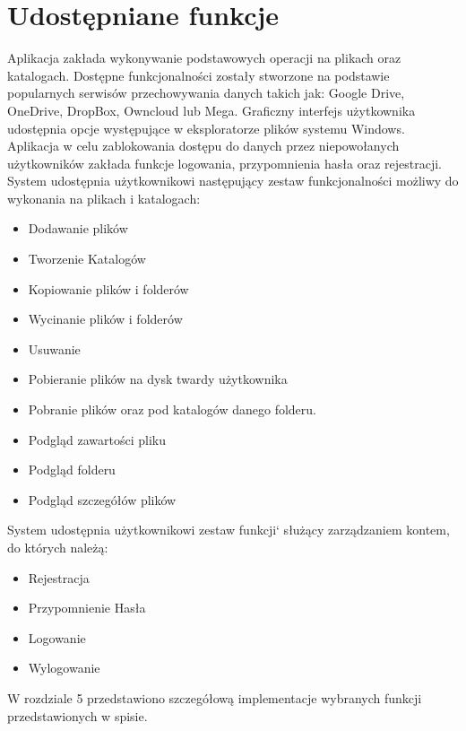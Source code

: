 \section{Udostępniane funkcje}
Aplikacja zakłada wykonywanie podstawowych operacji na plikach oraz katalogach. Dostępne funkcjonalności zostały stworzone na podstawie popularnych serwisów przechowywania danych takich jak: Google Drive, OneDrive, DropBox, Owncloud lub Mega. Graficzny interfejs użytkownika udostępnia opcje występujące w eksploratorze plików systemu Windows. 
Aplikacja w celu zablokowania dostępu do danych przez niepowołanych użytkowników zakłada funkcje logowania, przypomnienia hasła oraz rejestracji.  
\newpage
System udostępnia użytkownikowi następujący zestaw funkcjonalności możliwy do wykonania na plikach i katalogach:
\begin{itemize}[align=left]
	\item Dodawanie plików 
	\item Tworzenie Katalogów
	\item Kopiowanie plików i folderów
	\item Wycinanie plików i folderów
	\item Usuwanie
	\item Pobieranie plików na dysk twardy użytkownika
	\item Pobranie plików oraz pod katalogów danego folderu.
	\item Podgląd zawartości pliku 
	\item Podgląd folderu
	\item Podgląd szczegółów plików
\end{itemize}

System udostępnia użytkownikowi zestaw funkcji`  służący zarządzaniem kontem, do których należą:
\begin{itemize}[align=left]
	\item Rejestracja
	\item Przypomnienie Hasła
	\item Logowanie
	\item Wylogowanie
	
	
\end{itemize}


W rozdziale 5 przedstawiono szczegółową implementacje wybranych funkcji przedstawionych w spisie.